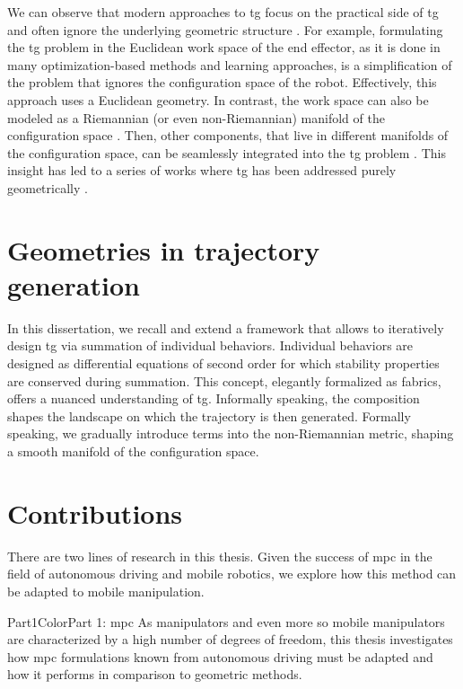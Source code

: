 We can observe that modern approaches to \ac{tg} focus on
the practical side of \ac{tg} and often ignore the
underlying geometric structure \cite{Ratliff2015}. For
example, formulating the \ac{tg} problem in the Euclidean
work space of the end effector, as it is done in many
optimization-based methods and learning approaches, is a
simplification of the problem that ignores the configuration
space of the robot. Effectively, this approach uses a
Euclidean geometry. In contrast, the work space can also be
modeled as a Riemannian (or even non-Riemannian) manifold of
the configuration space \cite{klein2023design}. Then, other
components, that live in different manifolds of the
configuration space, can be seamlessly integrated into the
\ac{tg} problem \cite{Ratliff2015}. This insight has led to
a series of works where \ac{tg} has been addressed
purely geometrically
\cite{Ratliff2015,Ratliff2018,Cheng2020,Cheng2020a,Ratliff2020,Xie2020}.

\section{Geometries in trajectory generation}
\label{sec:geometries_in_trajectory_generation}

In this dissertation, we recall and extend a framework
that allows to iteratively design \ac{tg} via
summation of individual behaviors. Individual behaviors are
designed as differential equations of second order for which
stability properties are conserved during summation.
This concept, elegantly formalized as \ac{fabrics}, offers
a nuanced understanding of \ac{tg}.
Informally speaking, the composition shapes the
landscape on which the trajectory is then generated.
Formally speaking, we gradually introduce terms into the
non-Riemannian metric, shaping a smooth manifold of the
configuration space.

\section{Contributions}
\label{sec:contributions}

There are two lines of research in this thesis. Given the
success of \ac{mpc} in the field of autonomous driving and
mobile robotics, we explore how this method can be adapted
to mobile manipulation. 
%
\begin{textbox}{Part1Color}{Part 1: \acl{mpc}}
  As manipulators and even more so mobile manipulators are
  characterized by a high number of degrees of freedom, this
  thesis investigates how \ac{mpc} formulations known from
  autonomous driving must be adapted and how
  it performs in comparison to geometric methods.
\end{textbox}
%

